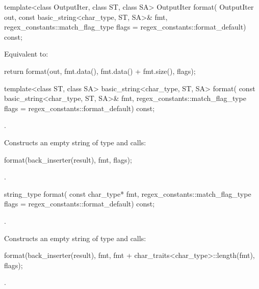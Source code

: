 %
\begin{itemdecl}
template<class OutputIter, class ST, class SA>
  OutputIter format(
      OutputIter out,
      const basic_string<char_type, ST, SA>& fmt,
      regex_constants::match_flag_type flags = regex_constants::format_default) const;
\end{itemdecl}

\begin{itemdescr}
\pnum
\effects
Equivalent to:
\begin{codeblock}
return format(out, fmt.data(), fmt.data() + fmt.size(), flags);
\end{codeblock}
\end{itemdescr}

%
\begin{itemdecl}
template<class ST, class SA>
  basic_string<char_type, ST, SA> format(
      const basic_string<char_type, ST, SA>& fmt,
      regex_constants::match_flag_type flags = regex_constants::format_default) const;
\end{itemdecl}

\begin{itemdescr}
\pnum
\expects
{}.

\pnum
\effects
Constructs an empty string  of type  and
calls:
\begin{codeblock}
format(back_inserter(result), fmt, flags);
\end{codeblock}

\pnum
\returns
{}.
\end{itemdescr}

%
\begin{itemdecl}
string_type format(
    const char_type* fmt,
    regex_constants::match_flag_type flags = regex_constants::format_default) const;
\end{itemdecl}

\begin{itemdescr}
\pnum
\expects
{}.

\pnum
\effects
Constructs an empty string  of type  and
calls:
\begin{codeblock}
format(back_inserter(result), fmt, fmt + char_traits<char_type>::length(fmt), flags);
\end{codeblock}

\pnum
\returns
{}.
\end{itemdescr}

